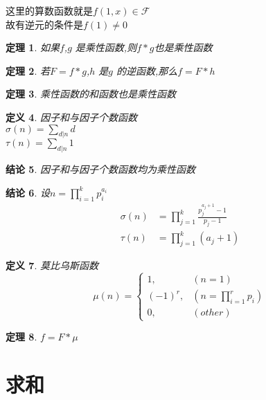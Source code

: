 \documentclass[12pt, a4paper, oneside]{ctexbook}
\newtheorem{theorem}{定理}[section]
\newtheorem{definition}[theorem]{定义}
\newtheorem{proposition}[theorem]{结论}
\begin{document}
这里的算数函数就是$f(1,x)\in \mathcal{F}$\\
故有逆元的条件是$f(1)\neq 0$\\

\begin{theorem}
  如果$f$,$g$ 是乘性函数,则$f*g$也是乘性函数
\end{theorem}


\begin{theorem}
  若$F=f*g$,$h$ 是$g$ 的逆函数,那么$f=F*h$
\end{theorem}

\begin{theorem}
  乘性函数的和函数也是乘性函数
\end{theorem}

\begin{definition}
  因子和与因子个数函数\\
  $\sigma(n)=\sum_{d|n} d $\\
  $\tau(n)=\sum_{d|n}1 $
\end{definition}

\begin{proposition}
  因子和与因子个数函数均为乘性函数
\end{proposition}

\begin{proposition}
  设$n=\prod_{i=1}^{k} p_i^{a_i}$\\
  \[
    \begin{aligned}
      \sigma(n)&=\prod_{j=1}^{k} \frac{p_j^{a_j+1}-1}{p_j-1}\\
      \tau(n)&=\prod_{j=1}^{k} (a_j+1)
    \end{aligned}
  \]
\end{proposition}


\begin{definition}
  莫比乌斯函数\\
  \[
  \mu(n)=\begin{cases}
    1,& (n=1)\\
    (-1)^r,& (n=\prod_{i=1}^{r}p_i)\\
    0,& (other)
    \end{cases}
  \]
\end{definition}

\begin{theorem}
  $f=F*\mu$
\end{theorem}

\chapter{求和}
\end{document}
